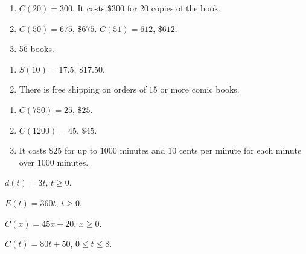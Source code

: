 \begin{exenum}

\item

\begin{enumerate}

\item   $C(20) = 300$.  It costs $\$300$ for 20 copies of the book.

\item $C(50) = 675$, $\$ 675$.  $C(51) = 612$, $\$ 612$.

\item   56 books.

\end{enumerate}

\item

\begin{enumerate}

\item   $S(10) = 17.5$, $\$ 17.50$.

\item  There is free shipping on orders of $15$ or more comic books.

\end{enumerate}

\item

\begin{enumerate}

\item   $C(750) = 25$, $\$ 25$.

\item   $C(1200) = 45$, $\$ 45$.

\item  It costs $\$25$ for up to $1000$ minutes and $10$ cents per minute for each minute over $1000$ minutes.

\end{enumerate}

\end{exenum}

\begin{shortexenum}

\item  $d(t) = 3t$, $t \geq 0$.
\item  $E(t) = 360t$, $t \geq 0$.
\item  $C(x) = 45x+20$, $x \geq 0$.
\item  $C(t) = 80t + 50$,  $0 \leq t \leq 8$.

\end{shortexenum}

